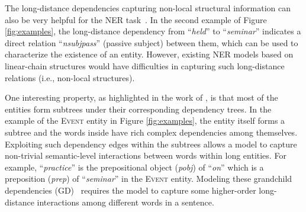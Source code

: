 The long-distance dependencies capturing non-local structural information can also be very helpful for the NER task~\cite{finkel2005incorporating}. 
In the second example of Figure \ref{fig:examples}, the long-distance dependency from ``\textit{held}'' to ``\textit{seminar}'' indicates a direct relation ``\textit{nsubjpass}'' (passive subject) between them, which can be used to characterize the existence of an entity. 
However, existing NER models based on linear-chain structures would have difficulties in capturing such long-distance relations (i.e., non-local structures).

One interesting property, as highlighted in the work of \citet{jie2017efficient}, is that most of the entities form subtrees under their corresponding dependency trees. 
In the example of the \textsc{Event} entity in Figure \ref{fig:examples}, the entity itself forms a subtree and the words inside have rich complex dependencies among themselves. 
Exploiting such dependency edges within the subtrees allows a model to capture non-trivial semantic-level interactions between words within long entities.
For example, ``\textit{practice}'' is the prepositional object (\textit{pobj}) of ``\textit{on}'' which is a preposition (\textit{prep}) of ``\textit{seminar}'' in the \textsc{Event} entity. 
Modeling these grandchild dependencies (GD)~\cite{koo2010efficient} requires the model to capture some higher-order long-distance interactions among different words in a sentence.



